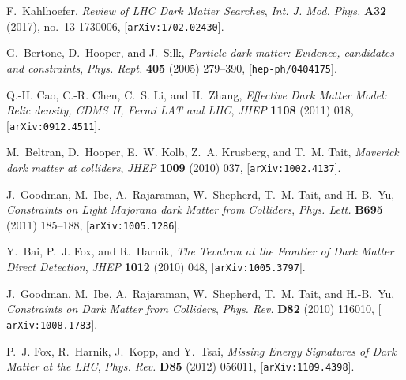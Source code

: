 \documentclass[review]{elsarticle}
\begin{document}
\newpage 

%
%

\providecommand{\href}[2]{#2}\begingroup\raggedright\begin{thebibliography}{100}

F.~Kahlhoefer, {\it {Review of LHC Dark Matter Searches}},  {\em Int. J. Mod.
  Phys.} {\bf A32} (2017), no.~13 1730006,
  [\href{http://arxiv.org/abs/1702.02430}{{\tt arXiv:1702.02430}}].

G.~Bertone, D.~Hooper, and J.~Silk, {\it {Particle dark matter: Evidence,
  candidates and constraints}},  {\em Phys. Rept.} {\bf 405} (2005) 279--390,
  [\href{http://arxiv.org/abs/hep-ph/0404175}{{\tt hep-ph/0404175}}].

Q.-H. Cao, C.-R. Chen, C.~S. Li, and H.~Zhang, {\it {Effective Dark Matter
  Model: Relic density, CDMS II, Fermi LAT and LHC}},  {\em JHEP} {\bf 1108}
  (2011) 018, [\href{http://arxiv.org/abs/0912.4511}{{\tt arXiv:0912.4511}}].

M.~Beltran, D.~Hooper, E.~W. Kolb, Z.~A. Krusberg, and T.~M. Tait, {\it
  {Maverick dark matter at colliders}},  {\em JHEP} {\bf 1009} (2010) 037,
  [\href{http://arxiv.org/abs/1002.4137}{{\tt arXiv:1002.4137}}].

J.~Goodman, M.~Ibe, A.~Rajaraman, W.~Shepherd, T.~M. Tait, and H.-B.~Yu, {\it
  {Constraints on Light Majorana dark Matter from Colliders}},  {\em
  Phys. Lett.}  {\bf B695} (2011) 185--188,
  [\href{http://arxiv.org/abs/1005.1286}{{\tt arXiv:1005.1286}}].

Y.~Bai, P.~J. Fox, and R.~Harnik, {\it {The Tevatron at the Frontier of Dark
  Matter Direct Detection}},  {\em JHEP} {\bf 1012} (2010) 048,
  [\href{http://arxiv.org/abs/1005.3797}{{\tt arXiv:1005.3797}}].

J.~Goodman, M.~Ibe, A.~Rajaraman, W.~Shepherd, T.~M. Tait, and H.-B.~Yu, {\it
  {Constraints on Dark Matter from Colliders}},  {\em Phys. Rev.}  {\bf D82}
  (2010) 116010, [\href{http://arxiv.org/abs/1008.1783}{{\tt
  arXiv:1008.1783}}].

P.~J. Fox, R.~Harnik, J.~Kopp, and Y.~Tsai, {\it {Missing Energy Signatures of
  Dark Matter at the LHC}},  {\em Phys. Rev.} {\bf D85} (2012) 056011,
  [\href{http://arxiv.org/abs/1109.4398}{{\tt arXiv:1109.4398}}].


\end{thebibliography}
\end{document}
